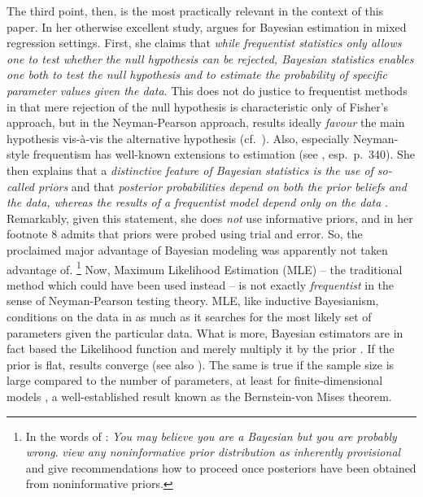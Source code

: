 \documentclass[USenglish]{article}
\begin{document}
The third point, then, is the most practically relevant in the context of this paper.
In her otherwise excellent study, \citet[251--252]{Levshina2016} argues for Bayesian estimation in mixed regression settings.
First, she claims that \textit{while frequentist statistics only allows one to test whether the null hypothesis can be rejected, Bayesian statistics enables one both to test the null hypothesis and to estimate the probability of specific parameter values given the data}.
This does not do justice to frequentist methods in that mere rejection of the null hypothesis is characteristic only of Fisher's approach, but in the Neyman-Pearson approach, results ideally \textit{favour} the main hypothesis vis-à-vis the alternative hypothesis (cf.\ \citealp{Lehmann1993,Lehmann2011,Perezgonzalez2015}).
Also, especially Neyman-style frequentism has well-known extensions to estimation (see \citealp{GreenlandEa2016}, esp.\ p.\ 340).
She then explains that a \textit{distinctive feature of Bayesian statistics is the use of so-called priors} and that \textit{posterior probabilities depend on both the prior beliefs and the data, whereas the results of a frequentist model depend only on the data} \cite[252]{Levshina2016}.
Remarkably, given this statement, she does \textit{not} use informative priors, and in her footnote 8 \cite[252]{Levshina2016} admits that priors were probed using trial and error.
So, the proclaimed major advantage of Bayesian modeling was apparently not taken advantage of.%
\footnote{In the words of \cite{Senn2011}: \textit{You may believe you are a Bayesian but you are probably wrong}.
\citet[347--348]{GelmanHill2006} \textit{view any noninformative prior distribution as inherently provisional} and give recommendations how to proceed once posteriors have been obtained from noninformative priors.}
Now, Maximum Likelihood Estimation (MLE) -- the traditional method which could have been used instead -- is not exactly \textit{frequentist} in the sense of Neyman-Pearson testing theory.
MLE, like inductive Bayesianism, conditions on the data in as much as it searches for the most likely set of parameters given the particular data.
What is more, Bayesian estimators are in fact based the Likelihood function and merely multiply it by the prior \citep[6--8]{GelmanEa2014}.
If the prior is flat, results converge (see also \citealp[347]{GelmanHill2006}).
The same is true if the sample size is large compared to the number of parameters, at least for finite-dimensional models \citep[1119--1120]{Freedman1999}, a well-established result known as the Bernstein-von Mises theorem.
\end{document}
